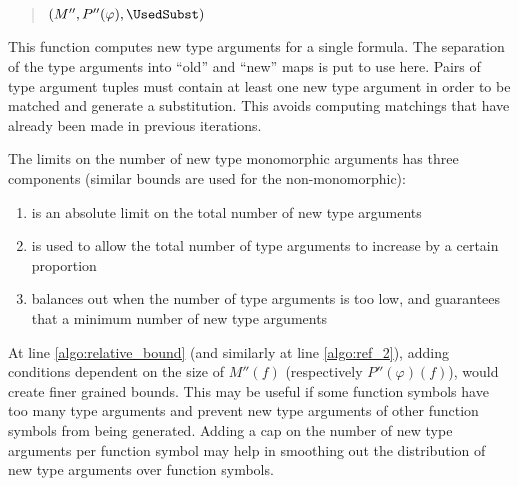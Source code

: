 \documentclass[]{ceurart}
\begin{document}
\begin{quote}
\begin{algorithm}[H]
{{{         }
      }
   }
   \BlankLine

   \Return \((M'', P''(\varphi), \UsedSubst)\)

\end{algorithm}
\end{quote}

This function computes new type arguments for a single formula. The separation of the type arguments into ``old'' and ``new'' maps is put to use here. Pairs of type argument tuples must contain at least one new type argument in order to be matched and generate a substitution. This avoids computing matchings that have already been made in previous iterations.

The limits on the number of new type monomorphic arguments has three components (similar bounds are used for the non-monomorphic):
\begin{enumerate}
   \item \MonoCap is an absolute limit on the total number of new type arguments
   \item \MonoMult is used to allow the total number of type arguments to increase by a certain proportion
   \item \MonoFloor balances out \MonoMult when the number of type arguments is too low, and guarantees that a minimum number of new type arguments
\end{enumerate}

At line \ref{algo:relative_bound} (and similarly at line \ref{algo:ref_2}), adding conditions dependent on the size of \(M''(f)\) (respectively \(P''(\varphi)(f)\)), would create finer grained bounds. This may be useful if some function symbols have too many type arguments and prevent new type arguments of other function symbols from being generated. Adding a cap on the number of new type arguments per function symbol may help in smoothing out the distribution of new type arguments over function symbols.
\end{document}
